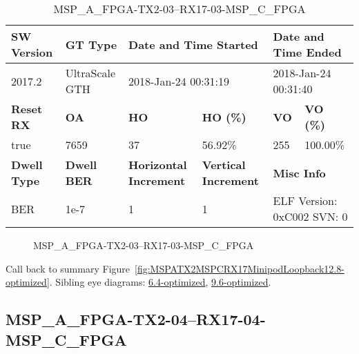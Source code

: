 \begin{table}[h]
\centering
\caption{MSP\_A\_FPGA-TX2-03--RX17-03-MSP\_C\_FPGA}
\label{tab:MSPAFPGATX203RX1703MSPCFPGA12.8-optimized}
\begin{tabular}{@{}|l|l|l|l|l|l|@{}}
\toprule
\textbf{SW Version}                & \textbf{GT Type}   & \multicolumn{2}{l|}{\textbf{Date and Time Started}}            & \multicolumn{2}{l|}{\textbf{Date and Time Ended}}        \\ \midrule
2017.2                       & UltraScale GTH          & \multicolumn{2}{l|}{2018-Jan-24 00:31:19}                   & \multicolumn{2}{l|}{2018-Jan-24 00:31:40}               \\ \midrule
\textbf{Reset RX}                  & \textbf{OA} & \textbf{HO}   & \textbf{HO (\%)} & \textbf{VO} & \textbf{VO (\%)} \\ \midrule
true & 7659        & 37          & 56.92\%        & 255        & 100.00\%       \\ \midrule
\textbf{Dwell Type}                & \textbf{Dwell BER} & \textbf{Horizontal Increment} & \textbf{Vertical Increment}    & \multicolumn{2}{l|}{\textbf{Misc Info}}                  \\ \midrule
BER                            & 1e-7        & 1        & 1           & \multicolumn{2}{l|}{ELF Version: 0xC002 SVN: 0}                         \\ \bottomrule
\end{tabular}
\end{table}

\begin{figure}[h]
\caption{MSP\_A\_FPGA-TX2-03--RX17-03-MSP\_C\_FPGA} \label{fig:MSPAFPGATX203RX1703MSPCFPGA12.8-optimized}
\end{figure}

Call back to summary Figure~\ref{fig:MSPATX2MSPCRX17MinipodLoopback12.8-optimized}.
Sibling eye diagrams: \hyperref[sec:MSPAFPGATX203RX1703MSPCFPGA6.4-optimized]{6.4-optimized}, \hyperref[sec:MSPAFPGATX203RX1703MSPCFPGA9.6-optimized]{9.6-optimized}.

\clearpage
\newpage


\subsection{MSP\_A\_FPGA-TX2-04--RX17-04-MSP\_C\_FPGA}\label{sec:MSPAFPGATX204RX1704MSPCFPGA12.8-optimized}

